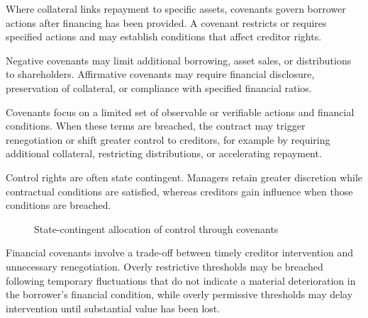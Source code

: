 Where collateral links repayment to specific assets, covenants govern borrower actions after financing has been provided. A covenant restricts or requires specified actions and may establish conditions that affect creditor rights.

Negative covenants may limit additional borrowing, asset sales, or distributions to shareholders. Affirmative covenants may require financial disclosure, preservation of collateral, or compliance with specified financial ratios.

Covenants focus on a limited set of observable or verifiable actions and financial conditions. When these terms are breached, the contract may trigger renegotiation or shift greater control to creditors, for example by requiring additional collateral, restricting distributions, or accelerating repayment.

Control rights are often state contingent. Managers retain greater discretion while contractual conditions are satisfied, whereas creditors gain influence when those conditions are breached.

\begin{figure}[H]
\centering
{}

\caption{State-contingent allocation of control through covenants}
\label{fig:ch3-covenant-control}
\end{figure}

Financial covenants involve a trade-off between timely creditor intervention and unnecessary renegotiation. Overly restrictive thresholds may be breached following temporary fluctuations that do not indicate a material deterioration in the borrower's financial condition, while overly permissive thresholds may delay intervention until substantial value has been lost.

